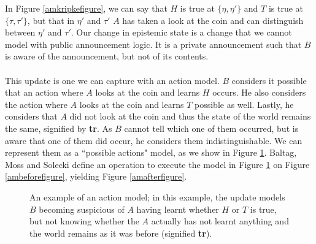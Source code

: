 \documentclass[12pt, a4paper, titlepage]{scrartcl}
\begin{document}
In Figure \ref{amkripkefigure}, we can say that $H$ is true at $\{\eta,\eta'\}$ and $T$ is
true at $\{\tau,\tau'\}$, but that in $\eta'$ and $\tau'$ $A$ has taken a look
at the coin and can distinguish between $\eta'$ and $\tau'$.
Our change in epistemic state is a change that we cannot model with public
announcement logic.
It is a private announcement such that $B$ is aware of the announcement, but not
of its contents.\\
\\
This update is one we can capture with an action model.
$B$ considers it possible that an action where $A$ looks at the coin and learns
$H$ occurs.
He also considers the action where $A$ looks at the coin and learns $T$ possible
as well.
Lastly, he considers that $A$ did not look at the coin and thus the state of the
world remains the same, signified by {\bf tr}.
As $B$ cannot tell which one of them occurred, but is aware that one of them did
occur, he considers them indistinguishable.
We can represent them as a ``possible actions" model, as we show in Figure
\ref{amprivatea}.
Baltag, Moss and Solecki define an operation to execute the model in Figure
\ref{amprivatea} on Figure \ref{ambeforefigure}, yielding Figure
\ref{amafterfigure}\cite{baltag1998lpa}.

\begin{figure}[H]
\centering
{}
\caption{An example of an action model; in this example, the update models $B$
becoming suspicious of $A$ having learnt whether $H$ or $T$ is true, but not
knowing whether the $A$ actually has not learnt anything and the world remains
as it was before (signified {\bf tr}).}
\label{amprivatea}
\end{figure}
\end{document}
